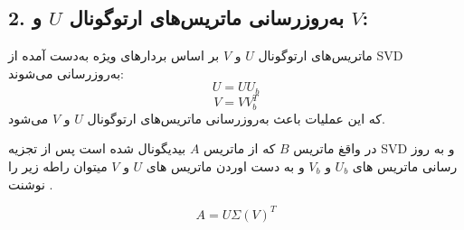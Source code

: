 \begin{enumerate}
\section*{2. به‌روزرسانی ماتریس‌های ارتوگونال \( U \) و \( V \):}
ماتریس‌های ارتوگونال \( U \) و \( V \) بر اساس بردارهای ویژه به‌دست آمده از SVD به‌روزرسانی می‌شوند:
\[
U = U U_b
\]
\[
V = V V_b^T
\]
که این عملیات باعث به‌روزرسانی ماتریس‌های ارتوگونال \( U \) و \( V \) می‌شود.

در واقغ ماتریس \( B \) که  از ماتریس \( A \)   بیدیگونال شده است پس از تجزیه SVD و به روز رسانی ماتریس های  \( U_b \) و \( V_b \)  و به دست اوردن ماتریس های  \( U \) و \( V \) میتوان راطه زیر را نوشنت .


\[
A = U \Sigma (V)^T
\]


\pagebreak

\end{enumerate}


